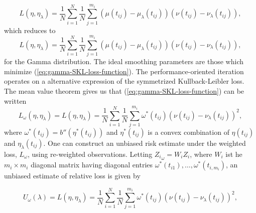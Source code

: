 \begin{equation}\label{eq:SKL-loss-function}
L\left( \eta,\eta_\lambda \right) = \frac{1}{N}\sum_{i=1}^N \frac{1}{N}\sum_{j=1}^{m_i}  \left(\mu\left(t_{ij}\right) - \mu_\lambda \left(t_{ij}\right)\right)\left( \nu\left(t_{ij}\right) - \nu_\lambda\left(t_{ij}\right)\right),
\end{equation}
\noindent
which reduces to 
\begin{equation}\label{eq:gamma-SKL-loss-function}
L\left( \eta,\eta_\lambda \right) = \frac{1}{N}\sum_{i=1}^N \frac{1}{N}\sum_{j=1}^{m_i}  \left(\mu\left(t_{ij}\right) - \mu_\lambda \left(t_{ij}\right)\right)\left( \nu\left(t_{ij}\right) - \nu_\lambda\left(t_{ij}\right)\right),
\end{equation}
\noindent
for the Gamma distribution. The ideal smoothing parameters are those which minimize (\ref{eq:gamma-SKL-loss-function}). The performance-oriented iteration operates on a alternative expression of the symmetrized Kullback-Leibler loss. The mean value theorem gives us that (\ref{eq:gamma-SKL-loss-function}) can be written
\begin{equation}\label{eq:gamma-SKL-loss-function-mvt}
L_\omega\left( \eta,\eta_\lambda \right) = L\left( \eta,\eta_\lambda \right) = \frac{1}{N}\sum_{i=1}^N \frac{1}{N}\sum_{j=1}^{m_i} \omega^*\left(t_{ij}\right)  \left( \nu\left(t_{ij}\right) - \nu_\lambda\left(t_{ij}\right)\right)^2,
\end{equation}
\noindent
where $\omega^*\left(t_{ij}\right) = b''\left(\eta^*\left(t_{ij}\right)\right)$ and $\eta^*\left(t_{ij}\right)$ is a convex combination of  $\eta\left(t_{ij}\right)$ and $\eta_\lambda\left(t_{ij}\right)$. One can construct an unbiased risk estimate under the weighted loss, $L_\omega$, using re-weighted observations. Letting ${Z_{i}}_\omega = W_i Z_i$, where $W_i$ ist he $m_i \times m_i$ diagonal matrix having diagonal entries $\omega^*\left(t_{i1}\right), \dots, \omega^*\left(t_{i,m_i}\right)$, an unbiased estimate of relative loss is given by 

\begin{equation}\label{eq:weighted-unbiased-risk-estimate}
U_\omega\left( \lambda \right) = L\left( \eta,\eta_\lambda \right) = \frac{1}{N}\sum_{i=1}^N \frac{1}{N}\sum_{j=1}^{m_i} \omega^*\left(t_{ij}\right)  \left( \nu\left(t_{ij}\right) - \nu_\lambda\left(t_{ij}\right)\right)^2,
\end{equation}









